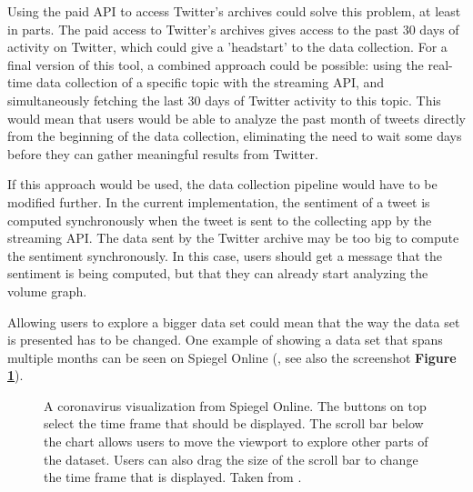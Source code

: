 Using the paid API to access Twitter's archives could solve this problem, at least in parts. The paid access to Twitter's archives gives access to the past 30 days of activity on Twitter, which could give a 'headstart' to the data collection. For a final version of this tool, a combined approach could be possible: using the real-time data collection of a specific topic with the streaming API, and simultaneously fetching the last 30 days of Twitter activity to this topic. This would mean that users would be able to analyze the past month of tweets directly from the beginning of the data collection, eliminating the need to wait some days before they can gather meaningful results from Twitter.

If this approach would be used, the data collection pipeline would have to be modified further. In the current implementation, the sentiment of a tweet is computed synchronously when the tweet is sent to the collecting app by the streaming API. The data sent by the Twitter archive may be too big to compute the sentiment synchronously. In this case, users should get a message that the sentiment is being computed, but that they can already start analyzing the volume graph.

Allowing users to explore a bigger data set could mean that the way the data set is presented has to be changed. One example of showing a data set that spans multiple months can be seen on Spiegel Online (\cite{merlotCoronavirusBrasilienManaus2020}, see also the screenshot \textbf{Figure \ref{fig:spiegel_visualization}}).

\begin{figure}[htb!]
    \caption{A coronavirus visualization from Spiegel Online. The buttons on top select the time frame that should be displayed. The scroll bar below the chart allows users to move the viewport to explore other parts of the dataset. Users can also drag the size of the scroll bar to change the time frame that is displayed. Taken from \cite{merlotCoronavirusBrasilienManaus2020}.}
    \label{fig:spiegel_visualization}
\end{figure}

